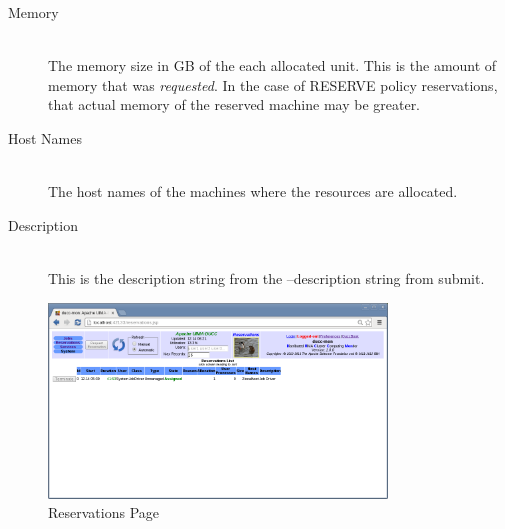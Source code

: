 \begin{description}
\item[Memory] \hfill \\
  The memory size in GB of the each allocated unit.  This is the amount of memory that
  was {\em requested}.  In the case of RESERVE policy reservations, that actual memory
  of the reserved machine may be greater.
  
\item[Host Names] \hfill \\
  The host names of the machines where the resources are allocated.
  
\item[Description] \hfill \\
  This is the description string from the --description string from submit.
\end{description}

    \begin{figure}[ht!]
    \centering
    \includegraphics[width=90mm]{images/ducc-webserver/Reservations.png}
    \caption{Reservations Page}
    \end{figure}
